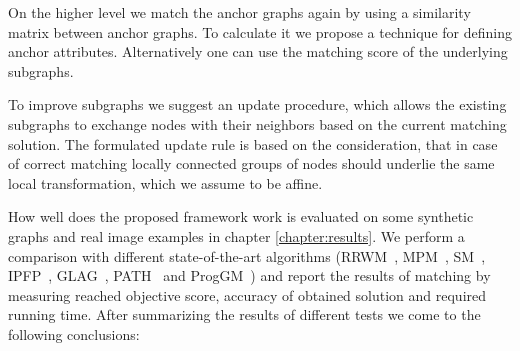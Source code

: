 On the higher level we match the anchor graphs again by using a similarity matrix between anchor graphs. To calculate it we propose a technique for defining anchor attributes. Alternatively one can use the matching score of the underlying subgraphs. 

To improve subgraphs we suggest an update procedure, which allows the existing subgraphs to exchange nodes with their neighbors based on the current matching solution. The formulated update rule is based on the consideration, that in case of correct matching locally connected groups of nodes should underlie the same local transformation, which we assume to be affine.

How well does the proposed framework work is evaluated on some synthetic graphs and real image examples in chapter \ref{chapter:results}. We perform a comparison with different state-of-the-art algorithms (RRWM~\cite{Cho2010_RRWM}, MPM~\cite{Cho2014_Haystack}, SM~\cite{Leordeanu2005_SM}, IPFP~\cite{Leordeanu2009_IPFP}, GLAG~\cite{Fiori2013_GLAG}, PATH~\cite{Zazlavskiy2008_PATH} and ProgGM~\cite{Cho2012_ProgressiveGM}) and report the results of matching by measuring reached objective score, accuracy of obtained solution and required running time. After summarizing the results of different tests we come to the following conclusions:
